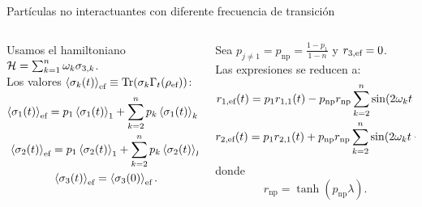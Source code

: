 \begin{frame}{Partículas no interactuantes con diferente frecuencia de transición}
    \begin{columns}
        \begin{column}{0.5\textwidth}
            Usamos el hamiltoniano $\mathcal{H}=\sum_{k=1}^{n}\omega_{k}\sigma_{3,k}$.\\ \pause
            Los valores $\expval{\sigma_{k}(t)}_{\text{ef}}\equiv\Tr(\sigma_{k}\Gamma_{t}(\rho_{\text{ef}}))$:\pause
            \begin{equation}
                \begin{gathered}
                \expval{\pauli{1}(t)}_{\ef}=p_{1} \expval{\sigma_{1}(t)}_{1}+\sum_{k=2}^{n}p_{k}\expval{\pauli{1}(t)}_{k}\text{\footnotemark}\pause\\
                \expval{\pauli{2}(t)}_{\ef}=p_{1} \expval{\sigma_{2}(t)}_{1}+\sum_{k=2}^{n}p_{k}\expval{\pauli{2}(t)}_{k}\pause\\
                \expval{\pauli{3}(t)}_{\ef}=\expval{\pauli{3}(0)}_{\ef}.
            \end{gathered}\nonumber
        \end{equation}
        \end{column}
        \pause
        \begin{column}{0.5\textwidth}
            Sea $p_{j\neq 1}=p_{\text{np}}=\frac{1-p_{1}}{1-n}$ y $r_{3,\text{ef}}=0$.\pause\\
            Las expresiones se reducen a:\pause
            \begin{equation}
                \begin{gathered}
                    r_{1,\text{ef}}(t)=p_{1}r_{1,1}(t)-p_{\text{np}}r_{\text{np}}\sum_{k=2}^{n}\sin(2\omega_{k} t-\phi)\\
                    r_{2,\text{ef}}(t)=p_{1}r_{2,1}(t)+p_{\text{np}}r_{\text{np}}\sum_{k=2}^{n}\sin(2\omega_{k} t+\theta).
                \end{gathered}\nonumber
            \end{equation}\pause
            donde\pause
            \begin{equation}
                r_{\text{np}}=\tanh(p_{\text{np}} \lambda).\nonumber
            \end{equation}
        \end{column}
    \end{columns}
\end{frame}
